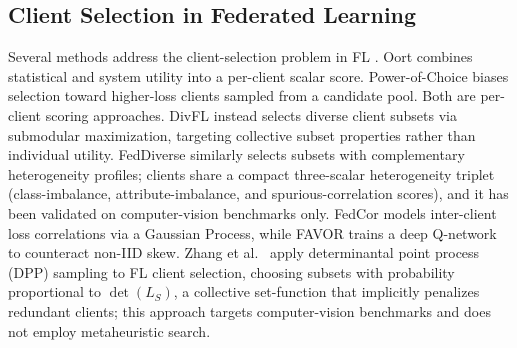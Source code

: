\documentclass[conference]{IEEEtran}
\begin{document}
\subsection{Client Selection in Federated Learning}
Several methods address the client-selection problem in FL \cite{li2024survey}. Oort \cite{lai2021oort} combines statistical and system utility into a per-client scalar score. Power-of-Choice \cite{cho2022poco} biases selection toward higher-loss clients sampled from a candidate pool. Both are per-client scoring approaches. DivFL \cite{balakrishnan2022divfl} instead selects diverse client subsets via submodular maximization, targeting collective subset properties rather than individual utility. FedDiverse \cite{nemeth2025feddiverse} similarly selects subsets with complementary heterogeneity profiles; clients share a compact three-scalar heterogeneity triplet (class-imbalance, attribute-imbalance, and spurious-correlation scores), and it has been validated on computer-vision benchmarks only. FedCor \cite{tang2022fedcor} models inter-client loss correlations via a Gaussian Process, while FAVOR \cite{wang2020favor} trains a deep Q-network to counteract non-IID skew. Zhang et al.\ \cite{zhang2023dpp} apply determinantal point process (DPP) sampling to FL client selection, choosing subsets with probability proportional to $\det(L_S)$, a collective set-function that implicitly penalizes redundant clients; this approach targets computer-vision benchmarks and does not employ metaheuristic search.
\end{document}
